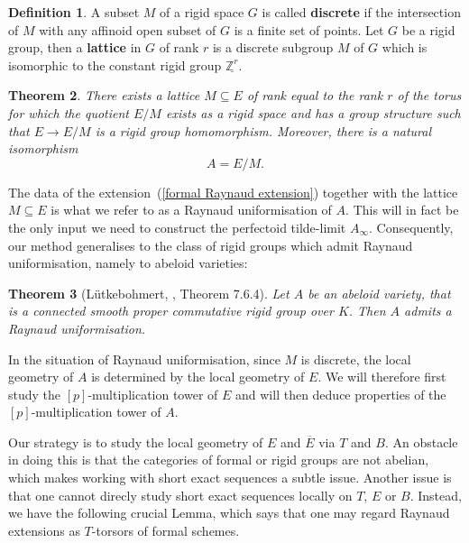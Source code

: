 \documentclass[10pt,oneside]{amsart}
\newtheorem{theorem}{Theorem}[section]
\theoremstyle{definition}
\newtheorem{definition}[theorem]{Definition}
\begin{document}
	\begin{definition}
		A subset $M$ of a rigid space $G$ is called \textbf{discrete} if the intersection of $M$ with any affinoid open subset of $G$ is a finite set of points.
		Let $G$ be a rigid group, then a \textbf{lattice} in $G$ of rank $r$ is a discrete subgroup $M$ of $G$ which is isomorphic to the constant rigid group $\underline{\mathbb Z^r}$. 
	\end{definition}
	
	\begin{theorem}\label{Raynaud uniformisation}
		There exists a lattice $M \subseteq E$ of rank equal to the rank $r$ of the torus for which the quotient $E/M$ exists as a rigid space and has a group structure such that $E\rightarrow E/M$ is a rigid group homomorphism. Moreover, there is a natural isomorphism
		\[A=E/M.\]
	\end{theorem}
	
	The data of the extension~(\ref{formal Raynaud extension}) together with the lattice $M\subseteq E$ is what we refer to as a Raynaud uniformisation of $A$. This will in fact be the only input we need to construct the perfectoid tilde-limit $A_\infty$. Consequently, our method generalises to the class of rigid groups which admit Raynaud uniformisation, namely to abeloid varieties:
	\begin{theorem}[L\"utkebohmert, \cite{rigid geometry of curves}, Theorem 7.6.4]\label{Raynaud uniformisation for abeloids}
		Let $A$ be an abeloid variety, that is a connected smooth proper commutative rigid group over $K$. Then $A$ admits a Raynaud uniformisation.
	\end{theorem}
	
	In the situation of Raynaud uniformisation, since $M$ is discrete, the local geometry of $A$ is determined by the local geometry of $E$. We will therefore first study the $[p]$-multiplication tower of $E$ and will then deduce properties of the $[p]$-multiplication tower of $A$.

	 Our strategy is to study the local geometry of $E$ and $\overline{E}$ via $T$ and $B$. An obstacle in doing this is that the categories of formal or rigid groups are not abelian, which makes working with short exact sequences a subtle issue. Another issue is that one cannot direcly study short exact sequences locally on $T$, $E$ or $B$. 
	Instead, we have the following crucial Lemma, which says that one may regard Raynaud extensions as $T$-torsors of formal schemes.
\end{document}

